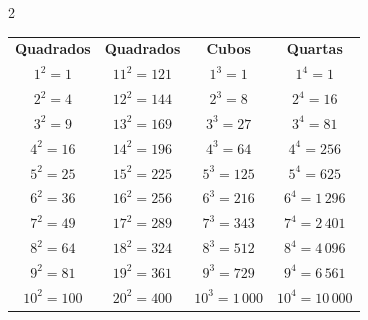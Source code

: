 \documentclass[12pt]{article}
\begin{document}
\begin{multicols}{2}




\end{multicols}

\vspace{4pt}

\vspace{6pt}
\begin{center}
\setlength{\tabcolsep}{14pt}\renewcommand{\arraystretch}{1.3}\small
\begin{tabular}{cccc}
\rowcolor{rulebg}
\textbf{Quadrados} & \textbf{Quadrados} & \textbf{Cubos} & \textbf{Quartas}\\
$1^2 = 1$   & $11^2 = 121$ & $1^3 = 1$    & $1^4 = 1$\\
\rowcolor{exbg}
$2^2 = 4$   & $12^2 = 144$ & $2^3 = 8$    & $2^4 = 16$\\
$3^2 = 9$   & $13^2 = 169$ & $3^3 = 27$   & $3^4 = 81$\\
\rowcolor{exbg}
$4^2 = 16$  & $14^2 = 196$ & $4^3 = 64$   & $4^4 = 256$\\
$5^2 = 25$  & $15^2 = 225$ & $5^3 = 125$  & $5^4 = 625$\\
\rowcolor{exbg}
$6^2 = 36$  & $16^2 = 256$ & $6^3 = 216$  & $6^4 = 1\,296$\\
$7^2 = 49$  & $17^2 = 289$ & $7^3 = 343$  & $7^4 = 2\,401$\\
\rowcolor{exbg}
$8^2 = 64$  & $18^2 = 324$ & $8^3 = 512$  & $8^4 = 4\,096$\\
$9^2 = 81$  & $19^2 = 361$ & $9^3 = 729$  & $9^4 = 6\,561$\\
\rowcolor{exbg}
$10^2 = 100$& $20^2 = 400$ & $10^3 = 1\,000$ & $10^4 = 10\,000$\\
\end{tabular}
\end{center}
\end{document}
